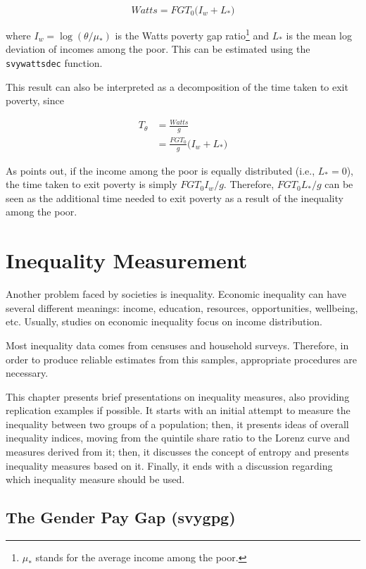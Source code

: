 \documentclass[
]{book}
\begin{document}
\[
Watts = FGT_0 \big( I_w + L_* \big)
\]

where \(I_w = \log(\theta/\mu_*)\) is the Watts poverty gap ratio\footnote{ \(\mu_*\) stands for the average income among the poor.} and \(L_*\) is the mean log deviation of incomes among the poor. This can be estimated using the \texttt{svywattsdec} function.

This result can also be interpreted as a decomposition of the time taken to exit poverty, since

\[
\begin{aligned}
T_\theta &= \frac{Watts}{g} \\ 
&= \frac{FGT_0}{g} \big( I_w + L_* \big)
\end{aligned}
\]

As \textcite{murdoch1998} points out, if the income among the poor is equally distributed (i.e., \(L_*=0\)), the time taken to exit poverty is simply \(FGT_0 I_w / g\). Therefore, \(FGT_0 L_* / g\) can be seen as the additional time needed to exit poverty as a result of the inequality among the poor.

\hypertarget{inequality}{%
\chapter{Inequality Measurement}\label{inequality}}

Another problem faced by societies is inequality. Economic inequality can have several different meanings: income, education, resources, opportunities, wellbeing, etc. Usually, studies on economic inequality focus on income distribution.

Most inequality data comes from censuses and household surveys. Therefore, in order to produce reliable estimates from this samples, appropriate procedures are necessary.

This chapter presents brief presentations on inequality measures, also providing replication examples if possible. It starts with an initial attempt to measure the inequality between two groups of a population; then, it presents ideas of overall inequality indices, moving from the quintile share ratio to the Lorenz curve and measures derived from it; then, it discusses the concept of entropy and presents inequality measures based on it. Finally, it ends with a discussion regarding which inequality measure should be used.

\hypertarget{the-gender-pay-gap-svygpg}{%
\section{The Gender Pay Gap (svygpg)}\label{the-gender-pay-gap-svygpg}}
\end{document}
